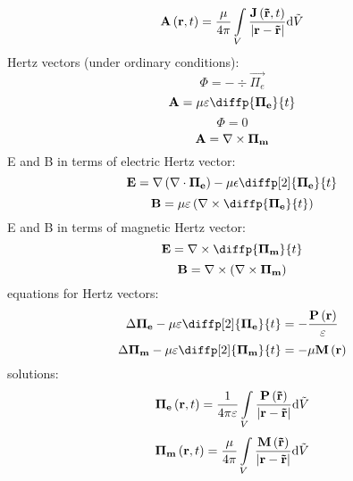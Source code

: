 \begin{equation}
\mathbf{A}\left(\mathbf{r}, t \right) = \frac{\mu}{4 \pi} \int\limits_{V} \frac{\mathbf{J}\left(\mathbf{\tilde{r}}, t \right)}{\lvert\mathbf{r} - \mathbf{\tilde{r}}\rvert} \mathrm{d} \tilde{V}
\end{equation}
Hertz vectors (under ordinary conditions):
\begin{equation}
\Phi = - \div{\vec{\Pi_e}}
\end{equation}
\begin{equation}
\vec{A} = \mu \varepsilon \diffp{\vec{\Pi_e}}{t}
\end{equation}
\begin{equation}
\Phi = 0
\end{equation}
\begin{equation}
\mathbf{A} = \nabla \times \mathbf{\Pi_m}
\end{equation}
E and B in terms of electric Hertz vector:
\begin{equation}
\vec{E} = \grad{\left(\div{\vec{\Pi_e}}\right)} - \mu \epsilon \diffp[2]{\vec{\Pi_e}}{t}
\end{equation}
\begin{equation}
\vec{B} = \mu \varepsilon \left(\rot{\diffp{\vec{\Pi_e}}{t}}\right)
\end{equation}
E and B in terms of magnetic Hertz vector:
\begin{equation}
\vec{E} = \rot{\diffp{\vec{\Pi_m}}{t}}
\end{equation}
\begin{equation}
\mathbf{B} = \nabla \times \left(\nabla \times \mathbf{\Pi_m}\right)
\end{equation}
equations for Hertz vectors:
\begin{equation}
\laplace{\vec{\Pi_e}} - \mu \varepsilon \diffp[2]{\vec{\Pi_e}}{t} = -\frac{\vec{P}\left(\vec{r} \right)}{\varepsilon}
\end{equation}
\begin{equation}
\laplace{\vec{\Pi_m}} - \mu \varepsilon \diffp[2]{\vec{\Pi_m}}{t} = -\mu \vec{M}\left(\vec{r} \right)
\end{equation}
solutions:
\begin{equation}
\mathbf{\Pi_e}\left(\mathbf{r}, t \right) = \frac{1}{4 \pi \varepsilon} \int\limits_{V} \frac{\mathbf{P}\left(\mathbf{\tilde{r}} \right)}{\lvert\mathbf{r} - \mathbf{\tilde{r}}\rvert} \mathrm{d} \tilde{V}
\end{equation}
\begin{equation}
\mathbf{\Pi_m}\left(\mathbf{r}, t \right) = \frac{\mu}{4 \pi} \int\limits_{V} \frac{\mathbf{M}\left(\mathbf{\tilde{r}} \right)}{\lvert\mathbf{r} - \mathbf{\tilde{r}}\rvert} \mathrm{d} \tilde{V}
\end{equation}

